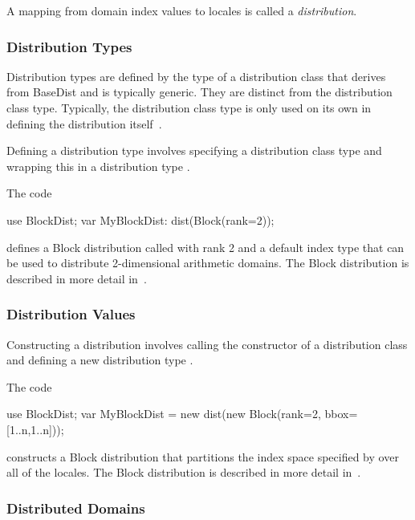 A mapping from domain index values to locales is called a {\em
distribution}.

\subsubsection{Distribution Types}
\label{Distribution_Types}

Distribution types are defined by the type of a distribution class
that derives from BaseDist and is typically generic.  They are
distinct from the distribution class type.  Typically, the
distribution class type is only used on its own in defining the
distribution itself~.

Defining a distribution type involves specifying a distribution class
type and wrapping this in a distribution type .
\begin{example}
The code
\begin{chapel}
use BlockDist;
var MyBlockDist: dist(Block(rank=2));
\end{chapel}
defines a Block distribution called  with rank 2 and
a default index type that can be used to distribute 2-dimensional
arithmetic domains.  The Block distribution is described in more
detail in~.
\end{example}

\subsubsection{Distribution Values}
\label{Distribution_Values}

Constructing a distribution involves calling the constructor of a
distribution class and defining a new distribution type .
\begin{example}
The code
\begin{chapel}
use BlockDist;
var MyBlockDist = new dist(new Block(rank=2, bbox=[1..n,1..n]));
\end{chapel}
constructs a Block distribution that partitions the index space
specified by \chpl{[1..n, 1..n]} over all of the locales.  The Block
distribution is described in more detail in~.
\end{example}

\subsubsection{Distributed Domains}
\label{Distributed_Domains}

